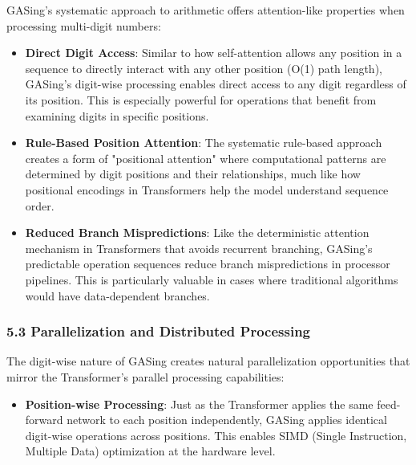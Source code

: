 GASing's systematic approach to arithmetic offers attention-like properties when processing multi-digit numbers:

\begin{itemize}
\item \textbf{Direct Digit Access}: Similar to how self-attention allows any position in a sequence to directly interact with any other position (O(1) path length), GASing's digit-wise processing enables direct access to any digit regardless of its position. This is especially powerful for operations that benefit from examining digits in specific positions.
\end{itemize}

\begin{itemize}
\item \textbf{Rule-Based Position Attention}: The systematic rule-based approach creates a form of "positional attention" where computational patterns are determined by digit positions and their relationships, much like how positional encodings in Transformers help the model understand sequence order.
\end{itemize}

\begin{itemize}
\item \textbf{Reduced Branch Mispredictions}: Like the deterministic attention mechanism in Transformers that avoids recurrent branching, GASing's predictable operation sequences reduce branch mispredictions in processor pipelines. This is particularly valuable in cases where traditional algorithms would have data-dependent branches.
\end{itemize}
\subsubsection{5.3 Parallelization and Distributed Processing}

The digit-wise nature of GASing creates natural parallelization opportunities that mirror the Transformer's parallel processing capabilities:

\begin{itemize}
\item \textbf{Position-wise Processing}: Just as the Transformer applies the same feed-forward network to each position independently, GASing applies identical digit-wise operations across positions. This enables SIMD (Single Instruction, Multiple Data) optimization at the hardware level.
\end{itemize}

